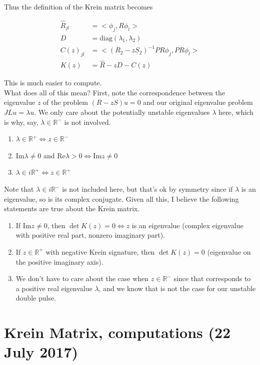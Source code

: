 \documentclass[12pt]{article}
\def\R{{\mathbb R}}
\begin{document}
Thus the definition of the Krein matrix becomes

\begin{align}\label{kreinmatrixsimple}
\hat{R}_{jl} &= <\phi_j, R \phi_l> \\
D &= \textrm{diag}(\lambda_1, \lambda_2) \\
C(z)_{jl} &= < ( R_2 - zS_2 )^{-1} P R \phi_j, P R \phi_l> \\
K(z) &= \hat{R} - zD - C(z)
\end{align}

This is much easier to compute.\\

What does all of this mean? First, note the correspondence between the eigenvalue $z$ of the problem $(R - zS)u = 0$ and our original eigenvalue problem $JLu = \lambda u$. We only care about the potentially unstable eigenvalues $\lambda$ here, which is why, say, $\lambda \in \R^-$ is not involved.
\begin{enumerate}
	\item $\lambda \in \R^+ \iff z \in \R^-$
	\item $\textrm{Im} \lambda \neq 0$ and $\textrm{Re} \lambda > 0 \iff \textrm{Im} z \neq 0$
	\item $\lambda \in i\R^+ \iff z \in \R^+$  
\end{enumerate}

Note that $\lambda \in i\R^-$ is not included here, but that's ok by symmetry since if $\lambda$ is an eigenvalue, so is its complex conjugate. Given all this, I believe the following statements are true about the Krein matrix. 

\begin{enumerate}
	\item If $\textrm{Im} z \neq 0$, then $\det K(z) = 0 \iff z$ is an eigenvalue (complex eigenvalue with positive real part, nonzero imaginary part).
	\item If $z \in \R^+$ with negative Krein signature, then $\det K(z) = 0$ (eigenvalue on the positive imaginary axis).
	\item We don't have to care about the case when $z \in \R^-$ since that corresponds to a positive real eigenvalue $\lambda$, and we know that is not the case for our unstable double pulse.
\end{enumerate}

\section{Krein Matrix, computations (22 July 2017)}
\end{document}
